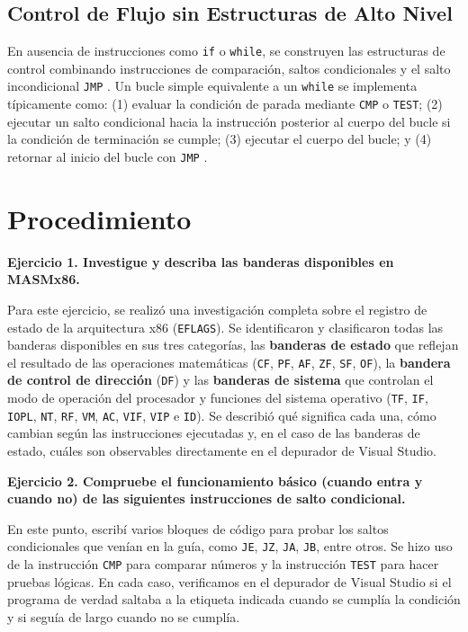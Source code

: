 \documentclass[a4paper,12pt]{article}
\begin{document}
\subsection{Control de Flujo sin Estructuras de Alto Nivel}
En ausencia de instrucciones como \texttt{if} o \texttt{while}, se construyen las estructuras de control combinando instrucciones de comparación, saltos condicionales y el salto incondicional \texttt{JMP} \cite{patterson2016computer}. Un bucle simple equivalente a un \texttt{while} se implementa típicamente como: (1) evaluar la condición de parada mediante \texttt{CMP} o \texttt{TEST}; (2) ejecutar un salto condicional hacia la instrucción posterior al cuerpo del bucle si la condición de terminación se cumple; (3) ejecutar el cuerpo del bucle; y (4) retornar al inicio del bucle con \texttt{JMP} \cite{irvine2020assembly}.

\newpage
\section{Procedimiento}
\textbf{Ejercicio 1. Investigue y describa las banderas disponibles en MASMx86.}

Para este ejercicio, se realizó una investigación completa sobre el registro de estado de la arquitectura x86 (\texttt{EFLAGS}). Se identificaron y clasificaron todas las banderas disponibles en sus tres categorías, las \textbf{banderas de estado} que reflejan el resultado de las operaciones matemáticas (\texttt{CF}, \texttt{PF}, \texttt{AF}, \texttt{ZF}, \texttt{SF}, \texttt{OF}), la \textbf{bandera de control de dirección} (\texttt{DF}) y las \textbf{banderas de sistema} que controlan el modo de operación del procesador y funciones del sistema operativo (\texttt{TF}, \texttt{IF}, \texttt{IOPL}, \texttt{NT}, \texttt{RF}, \texttt{VM}, \texttt{AC}, \texttt{VIF}, \texttt{VIP} e \texttt{ID}). Se describió qué significa cada una, cómo cambian según las instrucciones ejecutadas y, en el caso de las banderas de estado, cuáles son observables directamente en el depurador de Visual Studio.

\textbf{Ejercicio 2. Compruebe el funcionamiento básico (cuando entra y cuando no) de las siguientes instrucciones de salto condicional.}

En este punto, escribí varios bloques de código para probar los saltos condicionales que venían en la guía, como \texttt{JE}, \texttt{JZ}, \texttt{JA}, \texttt{JB}, entre otros. Se hizo uso de la instrucción \texttt{CMP} para comparar números y la instrucción \texttt{TEST} para hacer pruebas lógicas. En cada caso, verificamos en el depurador de Visual Studio si el programa de verdad saltaba a la etiqueta indicada cuando se cumplía la condición y si seguía de largo cuando no se cumplía.
\end{document}
